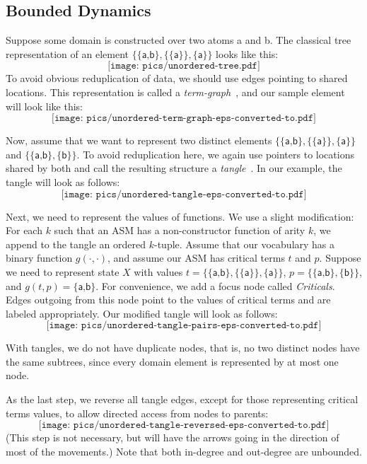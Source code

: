 \documentclass[submission,copyright,creativecommons,english]{eptcs}
\begin{document}
\subsection{Bounded Dynamics}

Suppose some domain is constructed over two atoms \textsf{a} and \textsf{b}. The classical tree representation of an element $\{\{\textsf{a,b}\},\{\{\textsf{a}\}\},\{\textsf{a}\}\}$   looks like this:
\[\texttt{[image: pics/unordered-tree.pdf]}\]
To avoid obvious reduplication of data, we should use edges pointing to shared locations. This representation is called a \emph{term-graph}~\cite{TermGraph}, and  our sample element will look like this:
\[\texttt{[image: pics/unordered-term-graph-eps-converted-to.pdf]}\]

Now, assume that  we want to represent two distinct elements   $\{\{\textsf{a,b}\},\{\{\textsf{a}\}\},\{\textsf{a}\}\}$ and $\{\{\textsf{a,b}\},\{\textsf{b}\}\}$. To avoid reduplication here, we again use pointers to  locations shared by both and call the resulting structure a \emph{tangle}~\cite{ECTT}. In our example, the tangle will look as follows:
\[\texttt{[image: pics/unordered-tangle-eps-converted-to.pdf]}\]

Next, we need to represent the values of functions. We use a slight modification:
For each $k$ such that an ASM has a non-constructor function of arity $k$, we append to the tangle an ordered $k$-tuple.
Assume that our vocabulary has a  binary function $g(\cdot,\cdot)$, and assume our ASM has critical terms $t$ and $p$.  Suppose we need to represent state $X$ with values $t=\{\{\textsf{a,b}\},\{\{\textsf{a}\}\},\{\textsf{a}\}\}$, $p=\{\{\textsf{a,b}\},\{\textsf{b}\}\}$, and $g(t,p)=\{\textsf{a,b}\}$. For convenience, we add a focus node called \emph{Criticals}. Edges outgoing from this node point to the values of critical terms and are labeled appropriately. Our modified tangle will look as follows:
\[\texttt{[image: pics/unordered-tangle-pairs-eps-converted-to.pdf]}\]

{With tangles, we do not have duplicate nodes, that is, no two distinct nodes have the same subtrees, since every domain element is represented by at most one node.}

As the last step, we reverse all tangle edges, except for those representing critical terms values, to allow directed access from nodes to parents:
\[\texttt{[image: pics/unordered-tangle-reversed-eps-converted-to.pdf]}\]
{(This step is not necessary, but will have the arrows going in the direction of most of the movements.)}
Note that both in-degree and out-degree are unbounded. 
\end{document}

